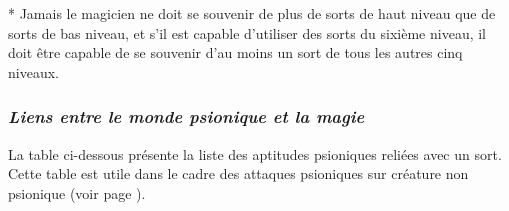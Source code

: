\bigskip

* Jamais le magicien ne doit se souvenir de plus de sorts de haut niveau que de sorts de bas niveau, et s'il est capable d'utiliser des sorts du sixième niveau, il doit être capable de se souvenir d'au moins un sort de tous les autres cinq niveaux.

\subsubsection*{\textit{Liens entre le monde psionique et la magie}}
\label{custom-liens-aptitudes-sorts}

La table ci-dessous présente la liste des aptitudes psioniques reliées avec un sort. Cette table est utile dans le cadre des attaques psioniques sur créature non psionique (voir page \pageref{custom-attaque-non-psionique}).

\bigskip

